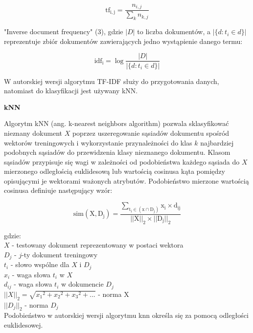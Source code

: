 \documentclass[a4paper, 10pt]{article}
\begin{document}
\begin{equation}
\mathrm{tf_{i,j}} = \frac{n_{i,j}}{\sum_k n_{k,j}}
\end{equation}

"Inverse document frequency" (3), gdzie $|D|$ to liczba dokumentów, a $|\{d : t_{i} \in d\}|$ reprezentuje zbiór dokumentów zawierających
jedno wystąpienie danego termu:

\begin{equation}
\mathrm{idf_{i}} =  \log \frac{|D|}{|\{d: t_{i} \in d\}|}
\end{equation}

W autorskiej wersji algorytmu TF-IDF służy do przygotowania danych, natomiast do klasyfikacji jest używany kNN.



{\bf{kNN}}

Algorytm kNN (ang. k-nearest neighbors algorithm) pozwala sklasyfikować nieznany dokument $X$  poprzez uszeregowanie sąsiadów dokumentu spośród wektorów treningowych i 
wykorzystanie przynależności do klas $k$ najbardziej podobnych sąsiadów do przewidzenia klasy nieznanego dokumentu. Klasom sąsiadów przypisuje się wagi w zależności od 
podobieństwa każdego sąsiada do $X$ mierzonego odległością euklidesową lub wartością cosinusa kąta pomiędzy opisującymi je wektorami ważonych atrybutów. 
Podobieństwo mierzone wartością cosinusa definiuje następujący wzór:

\begin{equation}
\mathrm{sim(X, D_{j}) = \frac{
\sum_{ t_{i} \in (x\cap D_{j})
  }x_{i} \times d_{ij}}{||X||_{2} \times ||D_{j}||_{2}}}
\end{equation}

gdzie:\\
$X$ - testowany dokument reprezentowany w postaci wektora\\
$D_{j}$ - $j$-ty dokument treningowy\\
$t_{i}$ - słowo wspólne dla $X$ i $D_{j}$\\
$x_{i}$ - waga słowa $t_{i}$ w $X$\\
$d_{ij}$ - waga słowa $t_{i}$ w dokumencie $D_{j}$\\
$||X||_{2} = \sqrt{{x_{1}}^{2} + {x_{2}}^{2} + {x_{3}}^{2} + ...}$ - norma X\\
$||D_{j}||_{2}$ - norma $D_{j}$\\

Podobieństwo w autorskiej wersji algorytmu knn określa się za pomocą odległości euklidesowej.


\end{document}
